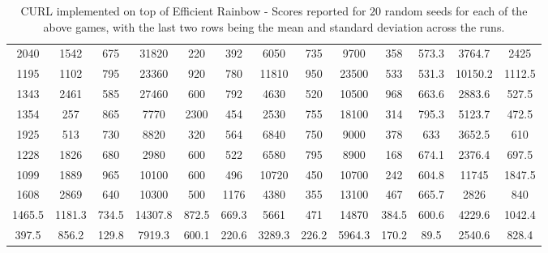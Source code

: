 \documentclass{article}
\begin{document}
\begin{table*}[!ht]
\begin{tabular}{c|c|c|c|c|c|c|c|c|c|c|c|c}
2040 &	1542 &	675 &	31820 &	220 &	392 &	6050 &	735 &	9700 &	358 &	573.3 &	3764.7 &	2425  \\
1195 &	1102 &	795 &	23360 &	920 &	780 &	11810 &	950 &	23500 &	533 &	531.3 &	10150.2 &	1112.5  \\
1343 &	2461 &	585	 & 27460 & 600 &	792 &	4630 &	520 &	10500 &	968 &	663.6 &	2883.6 &	527.5  \\
1354 &	257 &	865 &	7770 &	2300 &	454 &	2530 &	755 &	18100 &	314 &	795.3 &	5123.7	 & 472.5  \\
1925 &	513 &	730 &	8820 &	320 &	564 &	6840 &	750 &	9000 &	378 &	633 &	3652.5 &	610  \\
1228 &	1826 &	680 &	2980 &	600 &	522 &	6580 &	795 &	8900 &	168 &	674.1 &	2376.4 &	697.5  \\
1099 &	1889 &	965 &	10100 &	600 &	496 &	10720 &	450 &	10700 &	242 &	604.8 &	11745 &	1847.5 \\
1608 &	2869	 & 640 &	10300  & 500 &	1176 &	4380 &	355 &	13100 &	467 &	665.7 &	2826 &	840  \\
\hline
1465.5 &	1181.3 &	734.5 &	14307.8 &	872.5 &	669.3 &	5661 &	471 &	14870 &	384.5 &	600.6 &	4229.6 &	1042.4  \\ 
\hline
397.5 &	856.2 &	129.8 &	7919.3 &	600.1 &	220.6 &	3289.3 &	226.2 &	5964.3 &	170.2  & 89.5 &	2540.6 & 828.4 \\
\hline
\end{tabular}
\vspace*{-0mm}
\caption{CURL implemented on top of Efficient Rainbow - Scores reported for $20$ random seeds for each of the above games, with the last two rows being the mean and standard deviation across the runs.}
\label{tab:atari1}
\vspace{-2mm}
\end{table*}
\end{document}
